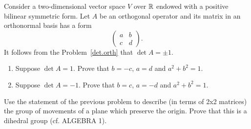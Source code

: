 \documentclass[12pt]{article}
\begin{document}
\begin{zadacha} 
Consider a two-dimensional vector space $V$  over  ${\mathbb R}$ endowed with a
positive  bilinear symmetric form. Let $A$ be an orthogonal operator
and its matrix in an orthonormal basis has a form
$$
\begin{pmatrix}
a & b\\
c & d
\end{pmatrix}.
$$
It follows from the Problem~\ref{det.orth} that $\det A = \pm 1$.
\begin{enumerate}
\item Suppose $\det A=1$.
Prove that  $b=-c$, $a =d$ and $a^2+b^2=1$.

\item Suppose $\det A=-1$.  
Prove that  $b=c$, $a =-d$ and $a^2+b^2=1$.
\end{enumerate}
\end{zadacha}

\begin{zadacha}[*] Use the statement of the previous problem to
describe (in terms of 2x2 matrices) the group of movements of a
plane which preserve the origin. Prove that this is a dihedral
group (cf. ALGEBRA 1).
\end{zadacha}
\end{document}

